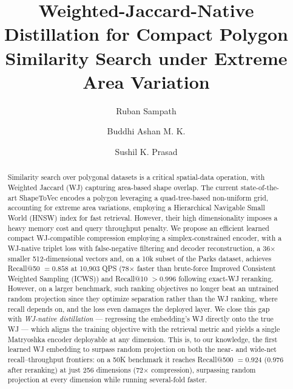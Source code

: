 \documentclass[sigconf]{acmart}
\begin{document}
\title{Weighted-Jaccard-Native Distillation for Compact Polygon
Similarity Search under Extreme Area Variation}

\author{Ruban Sampath}
\author{Buddhi Ashan M. K.}
\author{Sushil K. Prasad}
\renewcommand{\shortauthors}{Sampath et al.}

\begin{abstract}
Similarity search over polygonal datasets is a critical spatial-data operation, with
Weighted Jaccard (WJ) capturing area-based shape overlap. The current state-of-the-art
ShapeToVec encodes a polygon leveraging a quad-tree-based non-uniform grid, accounting
for extreme area variations, employing a Hierarchical Navigable Small World (HNSW)
index for fast retrieval. However, their high dimensionality imposes a heavy memory
cost and query throughput penalty. We propose an efficient learned compact
WJ-compatible compression employing a simplex-constrained encoder, with a WJ-native triplet loss with false-negative filtering and decoder reconstruction, a 36$\times$ smaller 512-dimensional vectors and, on a 10k
subset of the Parks dataset, achieves Recall@50 $=0.858$ at 10{,}903 QPS (78$\times$
faster than brute-force Improved Consistent Weighted Sampling (ICWS)) and Recall@10
$>0.996$ following exact-WJ reranking. However, on a larger 
benchmark, such ranking objectives no longer beat an untrained random projection since
they optimize separation rather than the WJ ranking, where recall depends on, and the loss
even damages the deployed layer. We close this gap with \emph{WJ-native distillation}
--- regressing the embedding's WJ directly onto the true WJ --- which aligns the
training objective with the retrieval metric and yields a single Matryoshka encoder
deployable at any dimension. This is, to our knowledge, the first learned WJ embedding
to surpass random projection on both the near- and wide-net recall--throughput
frontiers: on a 50K benchmark it reaches Recall@500 $=0.924$ ($0.976$ after
reranking) at just 256 dimensions (72$\times$ compression), surpassing random
projection at every dimension while running several-fold faster.
\end{abstract}
\end{document}

